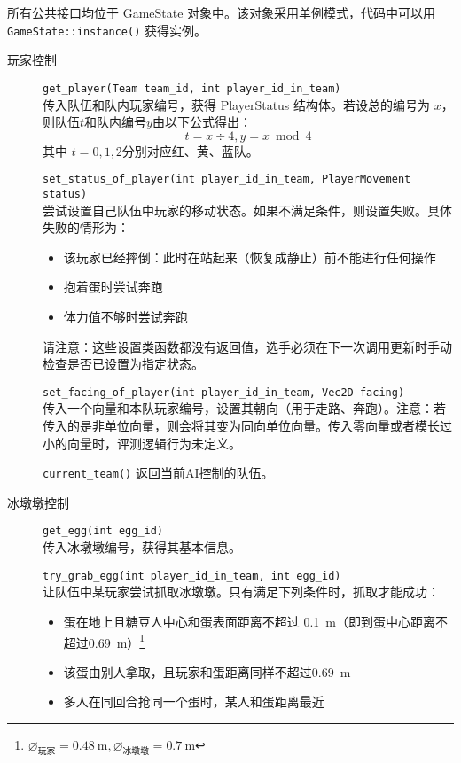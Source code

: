 \documentclass{article}
\begin{document}
所有公共接口均位于 GameState 对象中。该对象采用单例模式，代码中可以用 \lstinline{GameState::instance()} 获得实例。

\begin{description}
\item[玩家控制] \lstinline{get_player(Team team_id, int player_id_in_team)}\\[-2pt]
传入队伍和队内玩家编号，获得 PlayerStatus 结构体。若设总的编号为 $x$，则队伍$t$和队内编号$y$由以下公式得出：
\[t = x \div 4, y = x \bmod 4\]
其中 $t=0,1,2$分别对应红、黄、蓝队。

\lstinline{set_status_of_player(int player_id_in_team, PlayerMovement status)}\\[-2pt]
尝试设置自己队伍中玩家的移动状态。如果不满足条件，则设置失败。具体失败的情形为：
\begin{itemize}\setlength\itemsep{0em}
\item 该玩家已经摔倒：此时在站起来（恢复成静止）前不能进行任何操作
\item 抱着蛋时尝试奔跑
\item 体力值不够时尝试奔跑
\end{itemize}

请注意：这些设置类函数\color{red}都没有返回值\color{black}，选手必须在下一次调用更新时手动检查是否已设置为指定状态。

\lstinline{set_facing_of_player(int player_id_in_team, Vec2D facing)}\\[-2pt]
传入一个向量和本队玩家编号，设置其朝向（用于走路、奔跑）。注意：若传入的是非单位向量，则会将其变为同向单位向量。传入零向量或者模长过小的向量时，评测逻辑行为未定义。

\lstinline{current_team()}
返回当前AI控制的队伍。

\item[冰墩墩控制] \lstinline{get_egg(int egg_id)}\\[-2pt]
传入冰墩墩编号，获得其基本信息。

\lstinline{try_grab_egg(int player_id_in_team, int egg_id)}\\[-2pt]
让队伍中某玩家尝试抓取冰墩墩。只有满足下列条件时，抓取才能成功：

\begin{itemize}\setlength\itemsep{0em}
\item 蛋在地上且糖豆人中心和蛋表面距离不超过 \SI{0.1}{\meter}（即到蛋中心距离不超过\SI{0.69}{\meter}）\footnote{$\diameter_{\text{玩家}}=\SI{0.48}{\meter},\diameter_{\text{冰墩墩}}=\SI{0.7}{\meter}$}
\item 该蛋由别人拿取，且玩家和蛋距离同样不超过\SI{0.69}{\meter}
\item 多人在同回合抢同一个蛋时，某人和蛋距离最近
\end{itemize}


\end{description}
\end{document}
